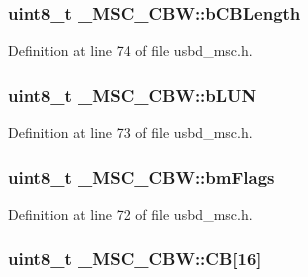 \subsubsection[{\texorpdfstring{b\+C\+B\+Length}{bCBLength}}]{\setlength{\rightskip}{0pt plus 5cm}uint8\+\_\+t \+\_\+\+M\+S\+C\+\_\+\+C\+B\+W\+::b\+C\+B\+Length}\hypertarget{struct__MSC__CBW_a2b867486ab4560cb4a6af62289415400}{}\label{struct__MSC__CBW_a2b867486ab4560cb4a6af62289415400}


Definition at line 74 of file usbd\+\_\+msc.\+h.

\subsubsection[{\texorpdfstring{b\+L\+UN}{bLUN}}]{\setlength{\rightskip}{0pt plus 5cm}uint8\+\_\+t \+\_\+\+M\+S\+C\+\_\+\+C\+B\+W\+::b\+L\+UN}\hypertarget{struct__MSC__CBW_aa6b62e68b9e2b63792ab904e2f090107}{}\label{struct__MSC__CBW_aa6b62e68b9e2b63792ab904e2f090107}


Definition at line 73 of file usbd\+\_\+msc.\+h.

\subsubsection[{\texorpdfstring{bm\+Flags}{bmFlags}}]{\setlength{\rightskip}{0pt plus 5cm}uint8\+\_\+t \+\_\+\+M\+S\+C\+\_\+\+C\+B\+W\+::bm\+Flags}\hypertarget{struct__MSC__CBW_a57c100a025722a6f5a30c49035e5a23f}{}\label{struct__MSC__CBW_a57c100a025722a6f5a30c49035e5a23f}


Definition at line 72 of file usbd\+\_\+msc.\+h.

\subsubsection[{\texorpdfstring{CB}{CB}}]{\setlength{\rightskip}{0pt plus 5cm}uint8\+\_\+t \+\_\+\+M\+S\+C\+\_\+\+C\+B\+W\+::\+CB\mbox{[}16\mbox{]}}\hypertarget{struct__MSC__CBW_a9a89704eaaa2b7079085ecd40a908fe7}{}\label{struct__MSC__CBW_a9a89704eaaa2b7079085ecd40a908fe7}


